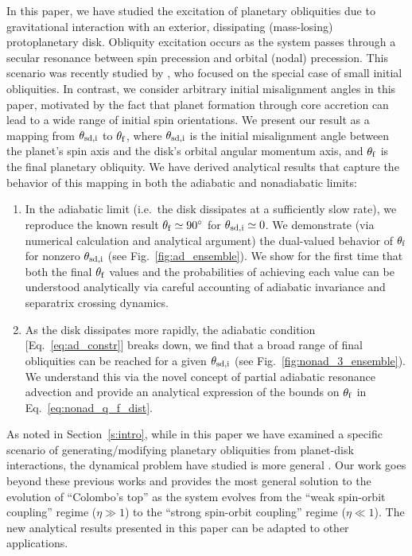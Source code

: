 \documentclass[twocolumn,twocolappendix]{aastex63}
\begin{document}
In this paper, we have studied the excitation of planetary obliquities due to
gravitational interaction with an exterior, dissipating (mass-losing)
protoplanetary disk. Obliquity excitation occurs as the system passes through a
secular resonance between spin precession and orbital (nodal) precession. This
scenario was recently studied by \citet{millholland_disk}, who focused on the
special case of small initial obliquities.  In contrast, we consider arbitrary
initial misalignment angles in this paper, motivated by the fact that planet
formation through core accretion can lead to a wide range of initial spin
orientations.  We present our result as a mapping from $\theta_{\rm sd, i}$ to
$\theta_{\rm f}$, where $\theta_{\rm sd, i}$ is the initial misalignment angle
between the planet's spin axis and the disk's orbital angular momentum axis, and
$\theta_{\rm f}$ is the final planetary obliquity. We have derived analytical
results that capture the behavior of this mapping in both the adiabatic and
nonadiabatic limits:
\begin{enumerate}
    \item In the adiabatic limit (i.e.\ the disk dissipates at a
        sufficiently slow rate), we reproduce the known result $\theta_{\rm f}
        \simeq 90^\circ$ for $\theta_{\rm sd, i} \simeq 0$. We demonstrate (via
        numerical calculation and analytical argument) the dual-valued behavior
        of $\theta_{\rm f}$ for nonzero $\theta_{\rm sd, i}$ (see
        Fig.~\ref{fig:ad_ensemble}). We \textcolor{Corr}{show for the first time
        that} both the final $\theta_{\rm f}$ values and the probabilities of
        achieving each value \textcolor{Corr}{can be understood analytically}
        via careful accounting of adiabatic invariance and separatrix crossing
        dynamics.

    \item As the disk dissipates more rapidly, the adiabatic condition
        [Eq.~\eqref{eq:ad_constr}] breaks down, we find that a broad range of
        final obliquities can be reached for a given $\theta_{\rm sd, i}$ (see
        Fig.~\ref{fig:nonad_3_ensemble}). We \textcolor{Corr}{understand this
        via the novel concept of partial adiabatic resonance advection and}
        provide an analytical expression of the bounds on $\theta_{\rm f}$ in
        Eq.~\eqref{eq:nonad_q_f_dist}.
\end{enumerate}

As noted in Section~\ref{s:intro}, while in this paper we have examined a
specific scenario of generating/modifying planetary obliquities from planet-disk
interactions, the dynamical problem have studied is more general
\citep{colombo1966,peale1969,peale1974possible,ward1975tidal,henrard1987}. Our
work goes beyond these previous works and provides the most general solution to
the evolution of ``Colombo's top'' as the system evolves from the ``weak
spin-orbit coupling'' regime ($\eta\gg 1$) to the ``strong spin-orbit coupling''
regime ($\eta\ll 1$).  The new analytical results presented in this paper can be
adapted to other applications.
\end{document}
